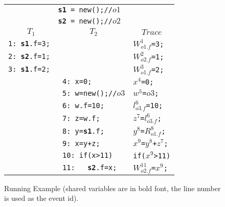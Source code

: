 \begin{figure}
\centering
\begin{tabular}{ll|l}
\multicolumn{3}{c}{{\tt {\bf s1} = new();//$o1$}} \\
\multicolumn{3}{c}{{\tt {\bf s2} = new();//$o2$}} \\
\multicolumn{1}{c}{$T_1$} & \multicolumn{1}{c}{$T_2$}  &  \multicolumn{1}{c}{$Trace$}\\
{\tt 1: {\bf s1}.f=3; } &  & {\tt $W^{1}_{o1.f}$=3;}\\
{\tt 2: {\bf s2}.f=1; } &  & {\tt $W^{2}_{o2.f}$=1;}\\
{\tt 3: {\bf s1}.f=2; } & & {\tt $W^{3}_{o1.f}$=2;} \\
& {\tt 4: x=0;} & {\tt $x^4$=0;}\\
& {\tt 5: w=new();//$o3$} & {\tt $w^5$=$o3$;}\\
& {\tt 6: w.f=10;}  & {\tt $l^6_{o3.f}$=10;}\\
& {\tt 7: z=w.f;} & {\tt $z^7$=$l^6_{o3.f}$;}\\
& {\tt 8: y={\bf s1}.f;} & {\tt $y^8$=$R^8_{o1.f}$;}\\
& {\tt 9: x=y+z;} & {\tt $x^9$=$y^8$+$z^7$;}\\
& {\tt 10: if(x>11)}& {\tt if($x^9$>11)}\\ 
& {\tt 11: \ \ {\bf s2}.f=x;}  & {\tt $W^{11}_{o2.f}$=$x^9$;}\\
\end{tabular}
\caption{Running Example (shared variables are in bold font, the line number is used as the event id). }
\label{fig:running2}
\end{figure}

 

